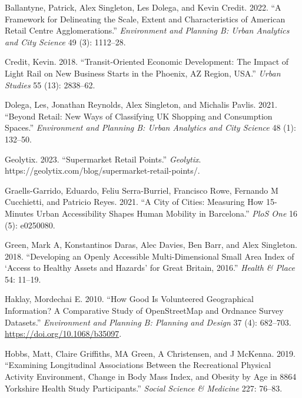 \documentclass[
]{article}
\newlength{\cslhangindent}
\newenvironment{CSLReferences}[2] %
 {\begin{list}{}{%
  \setlength{\itemindent}{0pt}
  \setlength{\leftmargin}{0pt}
  \setlength{\parsep}{0pt}
  \ifodd #1
   \setlength{\leftmargin}{\cslhangindent}
   \setlength{\itemindent}{-1\cslhangindent}
  \fi
  \setlength{\itemsep}{#2\baselineskip}}}
 {\end{list}}
\begin{document}
\label{refs}
\begin{CSLReferences}{1}{0}
Ballantyne, Patrick, Alex Singleton, Les Dolega, and Kevin Credit. 2022.
{``A Framework for Delineating the Scale, Extent and Characteristics of
{American} Retail Centre Agglomerations.''} \emph{Environment and
Planning B: Urban Analytics and City Science} 49 (3): 1112--28.

Credit, Kevin. 2018. {``Transit-Oriented Economic Development: {The}
Impact of Light Rail on New Business Starts in the {Phoenix}, {AZ
Region}, {USA}.''} \emph{Urban Studies} 55 (13): 2838--62.

Dolega, Les, Jonathan Reynolds, Alex Singleton, and Michalis Pavlis.
2021. {``Beyond Retail: {New} Ways of Classifying {UK} Shopping and
Consumption Spaces.''} \emph{Environment and Planning B: Urban Analytics
and City Science} 48 (1): 132--50.

Geolytix. 2023. {``Supermarket {Retail Points}.''} \emph{Geolytix}.
https://geolytix.com/blog/supermarket-retail-points/.

Graells-Garrido, Eduardo, Feliu Serra-Burriel, Francisco Rowe, Fernando
M Cucchietti, and Patricio Reyes. 2021. {``A City of Cities: {Measuring}
How 15-Minutes Urban Accessibility Shapes Human Mobility in
{Barcelona}.''} \emph{PloS One} 16 (5): e0250080.

Green, Mark A, Konstantinos Daras, Alec Davies, Ben Barr, and Alex
Singleton. 2018. {``Developing an Openly Accessible Multi-Dimensional
Small Area Index of {`{Access} to {Healthy Assets} and {Hazards}'} for
{Great Britain}, 2016.''} \emph{Health \& Place} 54: 11--19.

Haklay, Mordechai E. 2010. {``How {Good} Is {Volunteered Geographical
Information}? {A Comparative Study} of {OpenStreetMap} and {Ordnance
Survey Datasets}.''} \emph{Environment and Planning B: Planning and
Design} 37 (4): 682--703. \url{https://doi.org/10.1068/b35097}.

Hobbs, Matt, Claire Griffiths, MA Green, A Christensen, and J McKenna.
2019. {``Examining Longitudinal Associations Between the Recreational
Physical Activity Environment, Change in Body Mass Index, and Obesity by
Age in 8864 {Yorkshire Health Study} Participants.''} \emph{Social
Science \& Medicine} 227: 76--83.


\end{CSLReferences}
\end{document}
